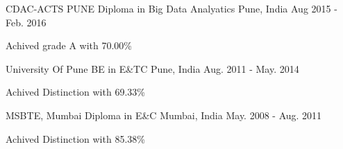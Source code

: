 

\begin{cventries}

 \cventry
    {CDAC-ACTS PUNE} %
    {Diploma in Big Data Analyatics} %
    {Pune, India} %
    {Aug 2015 - Feb. 2016} %
    {
      \begin{cvitems} %
        \item {Achived grade A with 70.00\%}
      \end{cvitems}
    }

  \cventry
    {University Of Pune} %
    {BE in E\&TC} %
    {Pune, India} %
    {Aug. 2011 - May. 2014} %
    {
      \begin{cvitems} %
        \item {Achived Distinction with 69.33\%}
      \end{cvitems}
    }

  \cventry
    {MSBTE, Mumbai} %
    {Diploma in  E\&C} %
    {Mumbai, India} %
    {May. 2008 - Aug. 2011} %
    {
      \begin{cvitems} %
        \item {Achived Distinction with 85.38\%}
      \end{cvitems}
    }

\end{cventries}
